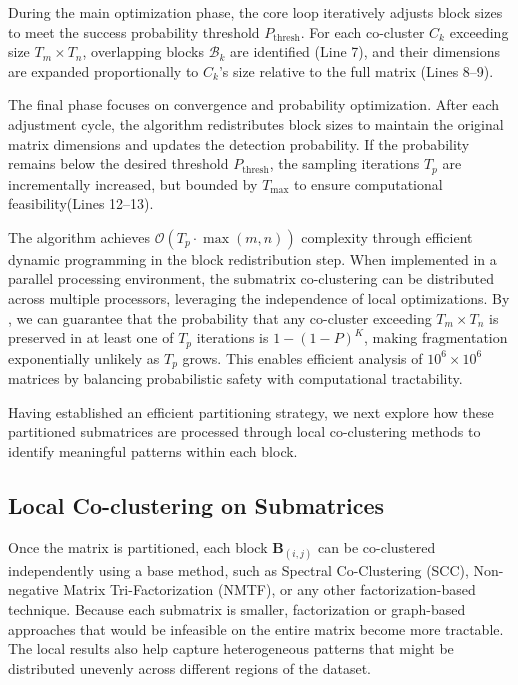 \documentclass[journal]{IEEEtran}
\begin{document}
During the main optimization phase, the core loop iteratively adjusts block sizes to meet the success probability threshold $P_{\text{thresh}}$. For each co-cluster $C_k$ exceeding size $T_m \times T_n$, overlapping blocks $\mathcal{B}_k$ are identified (Line 7), and their dimensions are expanded proportionally to $C_k$'s size relative to the full matrix (Lines 8--9).

The final phase focuses on convergence and probability optimization. After each adjustment cycle, the algorithm redistributes block sizes to maintain the original matrix dimensions and updates the detection probability. If the probability remains below the desired threshold $P_{\text{thresh}}$, the sampling iterations $T_p$ are incrementally increased, but bounded by $T_{\text{max}}$ to ensure computational feasibility(Lines 12--13).


The algorithm achieves $\mathcal{O}(T_p \cdot \max(m,n))$ complexity through efficient dynamic programming in the block redistribution step. When implemented in a parallel processing environment, the submatrix co-clustering can be distributed across multiple processors, leveraging the independence of local optimizations.
By , we can guarantee that the probability that any co-cluster exceeding $T_m \times T_n$ is preserved in at least one of $T_p$ iterations is $1 - (1 - P)^K$, making fragmentation exponentially unlikely as $T_p$ grows. This enables efficient analysis of $10^6 \times 10^6$ matrices by balancing probabilistic safety with computational tractability.

Having established an efficient partitioning strategy, we next explore how these partitioned submatrices are processed through local co-clustering methods to identify meaningful patterns within each block.


\subsection{Local Co-clustering on Submatrices}
\label{subsec:local_co_clustering}
Once the matrix is partitioned, each block $\mathbf{B}_{(i,j)}$ can be co-clustered independently using a base method, such as Spectral Co-Clustering (SCC), Non-negative Matrix Tri-Factorization (NMTF), or any other factorization-based technique. Because each submatrix is smaller, factorization or graph-based approaches that would be infeasible on the entire matrix become more tractable. The local results also help capture heterogeneous patterns that might be distributed unevenly across different regions of the dataset.
\end{document}
